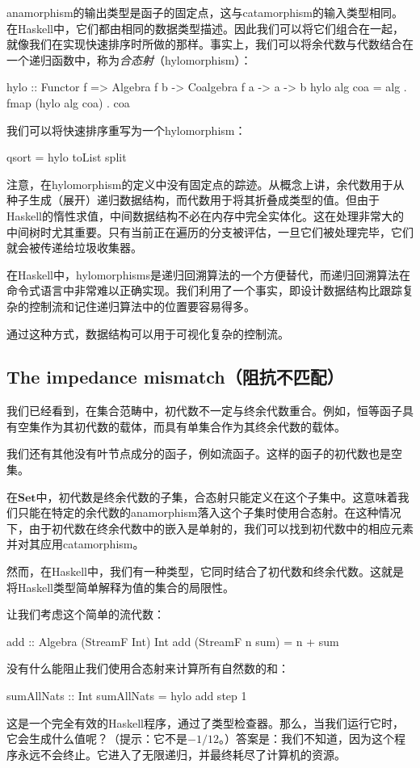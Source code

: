 \documentclass[DaoFP]{subfiles}
\begin{document}
    anamorphism的输出类型是函子的固定点，这与catamorphism的输入类型相同。在Haskell中，它们都由相同的数据类型描述。因此我们可以将它们组合在一起，就像我们在实现快速排序时所做的那样。事实上，我们可以将余代数与代数结合在一个递归函数中，称为\emph{合态射}（hylomorphism）：
    \begin{haskell}
        hylo :: Functor f => Algebra f b -> Coalgebra f a -> a -> b
        hylo alg coa = alg . fmap (hylo alg coa) . coa
    \end{haskell}
    我们可以将快速排序重写为一个hylomorphism：
    \begin{haskell}
        qsort = hylo toList split
    \end{haskell}

    注意，在hylomorphism的定义中没有固定点的踪迹。从概念上讲，余代数用于从种子生成（展开）递归数据结构，而代数用于将其折叠成类型的值。但由于Haskell的惰性求值，中间数据结构不必在内存中完全实体化。这在处理非常大的中间树时尤其重要。只有当前正在遍历的分支被评估，一旦它们被处理完毕，它们就会被传递给垃圾收集器。

    在Haskell中，hylomorphisms是递归回溯算法的一个方便替代，而递归回溯算法在命令式语言中非常难以正确实现。我们利用了一个事实，即设计数据结构比跟踪复杂的控制流和记住递归算法中的位置要容易得多。

    通过这种方式，数据结构可以用于可视化复杂的控制流。

    \subsection{The impedance mismatch（阻抗不匹配）}

    我们已经看到，在集合范畴中，初代数不一定与终余代数重合。例如，恒等函子具有空集作为其初代数的载体，而具有单集合作为其终余代数的载体。

    我们还有其他没有叶节点成分的函子，例如流函子。这样的函子的初代数也是空集。

    在$\mathbf{Set}$中，初代数是终余代数的子集，合态射只能定义在这个子集中。这意味着我们只能在特定的余代数的anamorphism落入这个子集时使用合态射。在这种情况下，由于初代数在终余代数中的嵌入是单射的，我们可以找到初代数中的相应元素并对其应用catamorphism。

    然而，在Haskell中，我们有一种类型，它同时结合了初代数和终余代数。这就是将Haskell类型简单解释为值的集合的局限性。

    让我们考虑这个简单的流代数：
    \begin{haskell}
        add :: Algebra (StreamF Int) Int
        add (StreamF n sum) = n + sum
    \end{haskell}
    没有什么能阻止我们使用合态射来计算所有自然数的和：
    \begin{haskell}
        sumAllNats :: Int
        sumAllNats = hylo add step 1
    \end{haskell}
    这是一个完全有效的Haskell程序，通过了类型检查器。那么，当我们运行它时，它会生成什么值呢？（提示：它不是$-1/12$。）答案是：我们不知道，因为这个程序永远不会终止。它进入了无限递归，并最终耗尽了计算机的资源。
\end{document}
